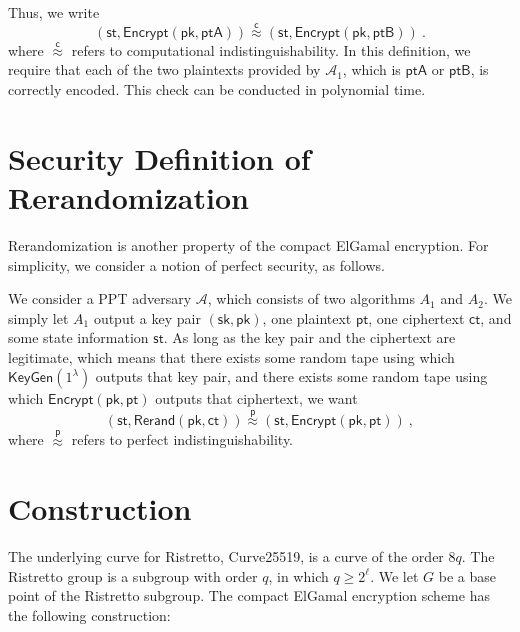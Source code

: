 \documentclass{article}
\begin{document}
Thus, we write
\[
(\mathsf{st}, \mathsf{Encrypt}\left(\mathsf{pk}, \mathsf{ptA}\right))\stackrel{\mathsf{c}}{\approx}(\mathsf{st}, \mathsf{Encrypt}\left(\mathsf{pk}, \mathsf{ptB}\right))~.
\]
where $\stackrel{\mathsf{c}}{\approx}$ refers to computational indistinguishability. In this definition, we require that each of the two plaintexts provided by $\mathcal{A}_1$, which is $\mathsf{ptA}$ or $\mathsf{ptB}$, is correctly encoded. This check can be conducted in polynomial time.

\section{Security Definition of Rerandomization}
Rerandomization is another property of the compact ElGamal encryption. For simplicity, we consider a notion of perfect security, as follows. 

We consider a PPT adversary $\mathcal{A}$, which consists of two algorithms $A_1$ and $A_2$. We simply let $A_1$ output a key pair $(\mathsf{sk},\mathsf{pk})$, one plaintext $\mathsf{pt}$, one ciphertext $\mathsf{ct}$, and some state information $\mathsf{st}$. As long as the key pair and the ciphertext are legitimate, which means that there exists some random tape using which $\mathsf{KeyGen}(1^\lambda)$ outputs that key pair, and there exists some random tape using which $\mathsf{Encrypt}(\mathsf{pk}, \mathsf{pt})$ outputs that ciphertext, we want
\[
\left(\mathsf{st}, \mathsf{Rerand}(\mathsf{pk}, \mathsf{ct})\right)\stackrel{\mathsf{p}}{\approx}\left(\mathsf{st}, \mathsf{Encrypt}(\mathsf{pk}, \mathsf{pt})\right)~,
\]
where $\stackrel{\mathsf{p}}{\approx}$ refers to perfect indistinguishability.

\section{Construction}
The underlying curve for Ristretto, Curve25519, is a curve of the order $8q$. The Ristretto group is a subgroup with order $q$, in which $q\geq 2^\ell$. We let $G$ be a base point of the Ristretto subgroup.  The compact ElGamal encryption scheme has the following construction:
\end{document}
